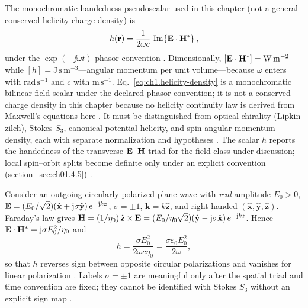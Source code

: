 The monochromatic handedness pseudoscalar used in this chapter (not a general conserved helicity charge density) is
\begin{equation}
\label{eq:ch1.helicity-density}
h(\mathbf{r})=
\frac{1}{2\omega c}\,
\Im\!\left\{\mathbf{E}\cdot\mathbf{H}^*\right\},
\end{equation}
under the $\exp(+\jj\omega t)$ phasor convention \cite{stratton1941,belinfante1940,tai1994}.
Dimensionally, $[\mathbf{E}\cdot\mathbf{H}^*]=\mathrm{W\,m^{-2}}$ while $[h]=\mathrm{J\,s\,m^{-3}}$---angular momentum per unit volume---because $\omega$ enters with $\mathrm{rad\,s^{-1}}$ and $c$ with $\mathrm{m\,s^{-1}}$.
Eq.~\eqref{eq:ch1.helicity-density} is a monochromatic bilinear field scalar under the declared phasor convention; it is not a conserved charge density in this chapter because no helicity continuity law is derived from Maxwell's equations here \cite{stratton1941,belinfante1940}. It must be distinguished from optical chirality (Lipkin zilch), Stokes $S_3$, canonical-potential helicity, and spin angular-momentum density, each with separate normalization and hypotheses \cite{stratton1941,tai1994}. The scalar $h$ reports the handedness of the transverse $\mathbf{E}$--$\mathbf{H}$ triad for the field class under discussion; local spin--orbit splits become definite only under an explicit convention (section~\ref{sec:ch01.4.5}) \cite{belinfante1940,stratton1941}.

Consider an outgoing circularly polarized plane wave with \emph{real} amplitude $E_0>0$,
$\mathbf{E}=(E_0/\sqrt{2})(\hat{\mathbf{x}}+\mathrm{j}\sigma\hat{\mathbf{y}})\,e^{-\mathrm{j} kz}$, $\sigma=\pm1$, $\mathbf{k}=k\hat{\mathbf{z}}$, and right-handed $(\hat{\mathbf{x}},\hat{\mathbf{y}},\hat{\mathbf{z}})$. Faraday's law gives
$\mathbf{H}=(1/\eta_0)\,\hat{\mathbf{z}}\times\mathbf{E}=(E_0/\eta_0\sqrt{2})(\hat{\mathbf{y}}-\mathrm{j}\sigma\hat{\mathbf{x}})\,e^{-\mathrm{j} kz}$.
Hence $\mathbf{E}\cdot\mathbf{H}^*=\mathrm{j}\sigma E_0^2/\eta_0$ and
\begin{equation}
\label{eq:ch1.helicity-plane-wave}
h=\frac{\sigma E_0^2}{2\omega c\eta_0}
=\frac{\sigma\varepsilon_0 E_0^2}{2\omega},
\end{equation}
so that $h$ reverses sign between opposite circular polarizations and vanishes for linear polarization \cite{stratton1941,belinfante1940}. Labels $\sigma=\pm1$ are meaningful only after the spatial triad and time convention are fixed; they cannot be identified with Stokes $S_3$ without an explicit sign map \cite{stratton1941}.

